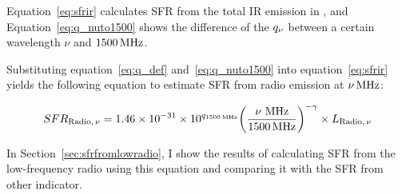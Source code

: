Equation~\ref{eq:sfrir} calculates SFR from the total IR emission in \citet{Murphy2011}, and Equation~\ref{eq:q_nuto1500} shows the difference of the $q_{\nu}$ between a certain wavelength $\nu$ and $1500\,\mathrm{MHz}$.

Substituting equation~\ref{eq:q_def} and~\ref{eq:q_nuto1500} into equation~\ref{eq:sfrir} yields the following equation to estimate SFR from radio emission at $\nu\,\mathrm{MHz}$:

\begin{equation}\label{eq:sfrfromradio}
    SFR_{\mathrm{Radio},\,\nu} = 1.46\times10^{-31}\times 10^{q_{\mathrm{1500\,\mathrm{MHz}}}} {\left(\frac{\nu\,\,\mathrm{MHz}}{1500\,\mathrm{MHz}}\right)}^{-\gamma} \times L_{\mathrm{Radio},\,\nu}
\end{equation}

In Section~\ref{sec:sfrfromlowradio}, I show the results of calculating SFR from the low-frequency radio using this equation and comparing it with the SFR from other indicator.



%
%
